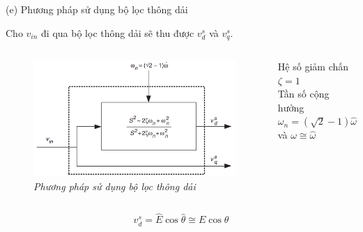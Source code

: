 \documentclass[11pt]{beamer}
\renewcommand{\label}[1]{%
			\gdef\sfname{sf:##1}}%
\begin{document}
\begin{frame}[t]{(e) Phương pháp sử dụng bộ lọc thông dải}
	
	Cho $v_{in}$ đi qua bộ lọc thông dải sẽ thu được $v_d^s$ và $v_q^s$.
	
		\begin{columns}
		\centering
			\begin{figure}[h]
				\includegraphics[width=1\textwidth]{Fig. 8 Method using all-pass filter.PNG}
				\caption{\centering \textit{Phương pháp sử dụng bộ lọc thông dải}}
				\label{fig:fig_8}
			\end{figure}
			Hệ số giảm chấn $\zeta = 1$\\
			Tần số cộng hưởng ${\omega}_n = (\sqrt{2} - 1)\hat{\omega}$\\
			và $\omega \cong \hat{\omega}$
		\end{columns}
		
		$$v_d^s = \hat{E} \cos{\hat{\theta}} \cong E\cos{\theta}$$
	
\end{frame}
\end{document}
